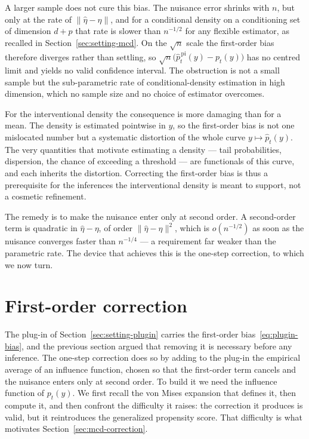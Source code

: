 \documentclass[11pt]{article}
\theoremstyle{plain}
\theoremstyle{definition}
\theoremstyle{remark}
\begin{document}
A larger sample does not cure this bias. The nuisance error shrinks with $n$, but only at the
rate of $\|\widehat\eta-\eta\|$, and for a conditional density on a conditioning set of
dimension $d+p$ that rate is slower than $n^{-1/2}$ for any flexible estimator, as recalled in
Section~\ref{sec:setting-mcd}. On the $\sqrt n$ scale the first-order bias therefore diverges
rather than settling, so $\sqrt n\big(\widehat p^{\,\mathrm{pi}}_t(y)-p_t(y)\big)$ has no
centred limit and yields no valid confidence interval. The obstruction is not a small sample
but the sub-parametric rate of conditional-density estimation in high dimension, which no
sample size and no choice of estimator overcomes.

For the interventional density the consequence is more damaging than for a mean. The density
is estimated pointwise in $y$, so the first-order bias is not one mislocated number but a
systematic distortion of the whole curve $y\mapsto\widehat p_t(y)$. The very quantities that
motivate estimating a density --- tail probabilities, dispersion, the chance of exceeding a
threshold --- are functionals of this curve, and each inherits the distortion. Correcting the
first-order bias is thus a prerequisite for the inferences the interventional density is meant
to support, not a cosmetic refinement.

The remedy is to make the nuisance enter only at second order. A second-order term is
quadratic in $\widehat\eta-\eta$, of order $\|\widehat\eta-\eta\|^2$, which is $o(n^{-1/2})$ as
soon as the nuisance converges faster than $n^{-1/4}$ --- a requirement far weaker than the
parametric rate. The device that achieves this is the one-step correction, to which we now
turn.

\section{First-order correction}
\label{sec:eif}

The plug-in of Section~\ref{sec:setting-plugin} carries the first-order
bias~\eqref{eq:plugin-bias}, and the previous section argued that removing it is necessary
before any inference. The one-step correction does so by adding to the plug-in the empirical
average of an influence function, chosen so that the first-order term cancels and the nuisance
enters only at second order. To build it we need the influence function of $p_t(y)$. We first
recall the von Mises expansion that defines it, then compute it, and then confront the
difficulty it raises: the correction it produces is valid, but it reintroduces the generalized
propensity score. That difficulty is what motivates Section~\ref{sec:mcd-correction}.
\end{document}
